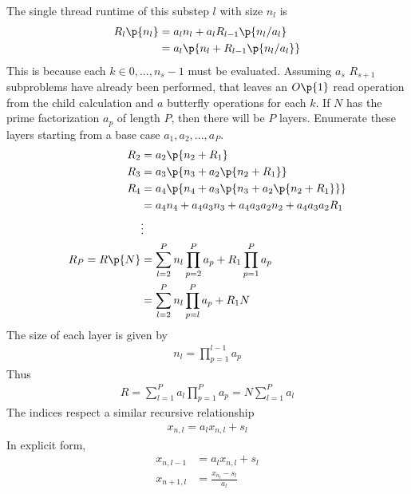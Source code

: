 \documentclass[11pt, a4paper]{article}
\begin{document}
The single thread runtime of this substep $l$ with size $n_{l}$ is
\begin{equation}\begin{aligned}
    R_{l}\p{n_{l}} &= a_{l} n_{l} + a_{l}R_{l-1} \p{n_{l}/a_{l}} \\
    &= a_{l} \p{n_{l} + R_{l-1}\p{n_{l}/a_{l}}} \\
\end{aligned}\end{equation}
This is because each $k \in 0, ..., n_{s}-1$ must be evaluated. Assuming $a_{s}$ $R_{s+1}$ subproblems have already been performed,
that leaves an $O\p{1}$ read operation from the child calculation and $a$ butterfly operations for each $k$.
If $N$ has the prime factorization $a_{p}$ of length $P$, then there will be $P$ layers. Enumerate these layers starting from
a base case $a_{1}, a_{2}, ..., a_{P}$.
\begin{equation}\begin{aligned}
    R_{2} &= a_{2} \p{n_{2} + R_{1}} \\
    R_{3} &= a_{3} \p{n_{3} + a_{2} \p{n_{2} + R_{1}}} \\
    R_{4} &= a_{4} \p{n_{4} + a_{3} \p{n_{3} + a_{2} \p{n_{2} + R_{1}}}} \\
          &= a_{4} n_{4} + a_{4} a_{3} n_{3} + a_{4} a_{3} a_{2} n_{2} + a_{4} a_{3} a_{2} R_{1} \\
          &\vdots \\
    R_{P} =  R \p{N} &= \sum_{l=2}^{P} n_{l} \prod_{p=2}^{P} a_{p} + R_{1} \prod_{p=1}^{P} a_{p} \\
    &=  \sum_{l=2}^{P} n_{l} \prod_{p=l}^{P} a_{p} + R_{1} N \\
\end{aligned}\end{equation}
The size of each layer is given by
\begin{equation}\begin{aligned}
    n_{l} = \prod_{p=1}^{l-1} a_{p}
\end{aligned}\end{equation}
Thus
\begin{equation}\begin{aligned}
    R = \sum_{l=1}^{P} a_{l} \prod_{p=1}^{P} a_{p} = N \sum_{l=1}^{P} a_{l}
\end{aligned}\end{equation}
The indices respect a similar recursive relationship
\begin{equation}\begin{aligned}
    x_{n,l} = a_{l} x_{n,l} + s_{l}
\end{aligned}\end{equation}
In explicit form,
\begin{equation}\begin{aligned}
    x_{n,l-1} &= a_{l} x_{n, l} + s_{l} \\
    x_{n+1, l} &= \frac{x_{n_{l}} - s_{l}}{a_{l}} \\
\end{aligned}\end{equation}
\end{document}
